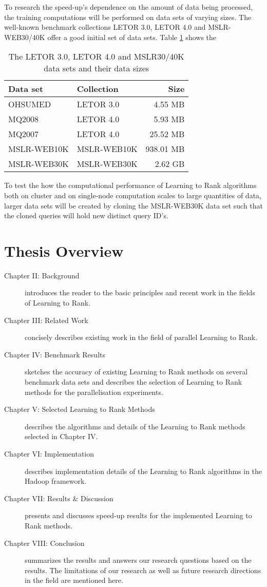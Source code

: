 To research the speed-up's dependence on the amount of data being processed, the training computations will be performed on data sets of varying sizes. The well-known benchmark collections LETOR 3.0, LETOR 4.0 and MSLR-WEB30/40K offer a good initial set of data sets. Table \ref{tbl:initial_datasets} shows the
\begin{table}[!h]
\centering
\begin{tabular}{p{3.4cm}p{3.4cm}r}\toprule
Data set & Collection & Size \\
\midrule
OHSUMED     & LETOR 3.0       &   4.55 MB\\
MQ2008      & LETOR 4.0       &   5.93 MB\\
MQ2007      & LETOR 4.0       &  25.52 MB\\
MSLR-WEB10K & MSLR-WEB10K     & 938.01 MB\\
MSLR-WEB30K & MSLR-WEB30K     &   2.62 GB\\
\bottomrule
\end{tabular}
\caption{The LETOR 3.0, LETOR 4.0 and MSLR30/40K data sets and their data sizes}
\label{tbl:initial_datasets}
\end{table}

To test the how the computational performance of Learning to Rank algorithms both on cluster and on single-node computation scales to large quantities of data, larger data sets will be created by cloning the MSLR-WEB30K data set such that the cloned queries will hold new distinct query ID's.
\section{Thesis Overview}

\begin{description}
\item[Chapter II: Background]{introduces the reader to the basic principles and recent work in the fields of Learning to Rank.}
\item[Chapter III: Related Work]{concisely describes existing work in the field of parallel Learning to Rank.}
\item[Chapter IV: Benchmark Results]{sketches the accuracy of existing Learning to Rank methods on several benchmark data sets and describes the selection of Learning to Rank methods for the parallelisation experiments.}
\item[Chapter V: Selected Learning to Rank Methods]{describes the algorithms and details of the Learning to Rank methods selected in Chapter IV.}
\item[Chapter VI: Implementation]{describes implementation details of the Learning to Rank algorithms in the Hadoop framework.}
\item[Chapter VII: Results \& Discussion]{presents and discusses speed-up results for the implemented Learning to Rank methods.}
\item[Chapter VIII: Conclusion]{summarizes the results and answers our research questions based on the results. The limitations of our research as well as future research directions in the field are mentioned here.}
\end{description}
